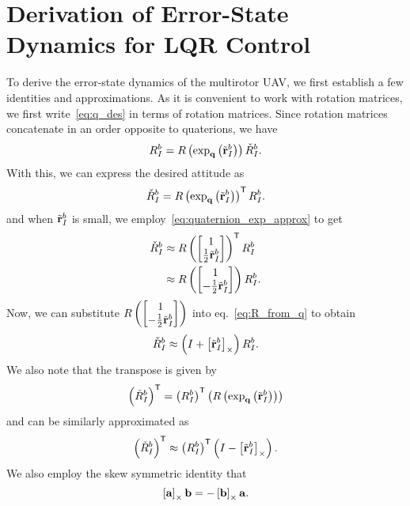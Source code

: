 \chapter{Derivation of Error-State Dynamics for LQR Control}
\label{apdx:control_err_state_derivation}

To derive the error-state dynamics of the multirotor UAV, we first establish a few
identities and approximations. As it is convenient to work with rotation
matrices, we first write~\eqref{eq:q_des} in terms of rotation matrices. Since 
rotation matrices concatenate in an order opposite to quaterions, we have
\begin{equation}
  R_{I}^{b} = R\left(\exp_{\mathrm{\mathbf{q}}}\left(\tilde{\mathrm{\mathbf{r}}}_{I}^{b}\right)\right)
  \check{R}_{I}^{b}.
\end{equation}
With this, we can express the desired attitude as
\begin{equation}
  \check{R}_{I}^{b} =
  R\left(\exp_{\mathrm{\mathbf{q}}}\left(\tilde{\mathrm{\mathbf{r}}}_{I}^{b}\right)\right)^{\mathsf{T}} R_{I}^{b}.
\end{equation}
and when $\tilde{\mathrm{\mathbf{r}}}_I^b$ is small, we employ~\eqref{eq:quaternion_exp_approx} to get
\begin{align}
  \des{R}_{I}^{b} &\approx R\left(
  \begin{bmatrix}1\\\frac{1}{2}\tilde{\vect{r}}_I^b\end{bmatrix}
\right)^\transpose R_{I}^{b} \\
  \phantom{\des{R}_{I}^{b}} &\approx R\left(
  \begin{bmatrix}1\\-\frac{1}{2}\tilde{\vect{r}}_I^b\end{bmatrix}
\right) R_{I}^{b}.
\end{align}
Now, we can substitute $R\left( \begin{bmatrix}1\\-\frac{1}{2}\tilde{\mathrm{\mathbf{r}}}_I^b\end{bmatrix} \right)$ into eq.~\eqref{eq:R_from_q} to obtain
\begin{equation}
  \check{R}_{I}^{b} \approx \left( I + \left[ \tilde{\mathrm{\mathbf{r}}}_I^b \right]_{\times} \right)
  R_{I}^{b}.
\end{equation}
We also note that the transpose is given by
\begin{equation}
  \left(\check{R}_{I}^{b}\right)^{\mathsf{T}} =
  \left(R_{I}^{b}\right)^{\mathsf{T}}
  \left(R\left(\exp_{\mathrm{\mathbf{q}}}\left(\tilde{\mathrm{\mathbf{r}}}_{I}^{b}\right)\right)\right)
\end{equation}
and can be similarly approximated as
\begin{equation}
  \left(\check{R}_{I}^{b}\right)^{\mathsf{T}} \approx
  \left(R_{I}^{b}\right)^{\mathsf{T}} \left( I - \left[ \tilde{\mathrm{\mathbf{r}}}_I^b \right]_{\times}
  \right).
\end{equation}
We also employ the skew symmetric identity that
\begin{equation}
  \left[ \mathrm{\mathbf{a}} \right]_{\times} \mathrm{\mathbf{b}} = -\left[ \mathrm{\mathbf{b}} \right]_{\times} \mathrm{\mathbf{a}}.
\end{equation}

